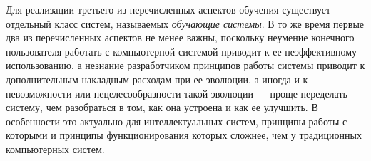 {Для реализации третьего из перечисленных аспектов обучения существует отдельный класс систем, называемых \textit{обучающие системы}. В то же время первые два из перечисленных аспектов не менее важны, поскольку неумение конечного пользователя работать с компьютерной системой приводит к ее неэффективному использованию, а незнание разработчиком принципов работы системы приводит к дополнительным накладным расходам при ее эволюции, а иногда и к невозможности или нецелесообразности такой эволюции --- проще переделать систему, чем разобраться в том, как она устроена и как ее улучшить. В особенности это актуально для интеллектуальных систем, принципы работы с которыми и принципы функционирования которых сложнее, чем у традиционных компьютерных систем.

\vspace{-\baselineskip}

}
